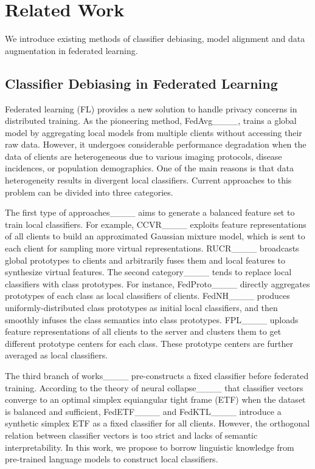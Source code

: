 \section{Related Work}
\label{sec:related-work}
We introduce existing methods of classifier debiasing, model alignment and data augmentation in federated learning.

\subsection{Classifier Debiasing in Federated Learning}
Federated learning (FL) provides a new solution to handle privacy concerns in distributed training. 
As the pioneering method, FedAvg____, trains a global model by aggregating local models from multiple clients without accessing their raw data. However, it undergoes considerable performance degradation when the data of clients are heterogeneous due to various imaging protocols, disease incidences, or population demographics. One of the main reasons is that data heterogeneity results in divergent local classifiers. Current approaches to this problem can be divided into three categories.

The first type of approaches____ aims to generate a balanced feature set to train local classifiers. For example, CCVR____ exploits feature representations of all clients to build an approximated Gaussian mixture model, which is sent to each client for sampling more virtual representations. RUCR____ broadcasts global prototypes to clients and arbitrarily fuses them and local features to synthesize virtual features.
The second category____ tends to replace local classifiers with class prototypes. For instance, FedProto____ directly aggregates prototypes of each class as local classifiers of clients. FedNH____ produces uniformly-distributed class prototypes as initial local classifiers, and then smoothly infuses the class semantics into class prototypes. FPL____ uploads feature representations of all clients to the server and clusters them to get different prototype centers for each class. These prototype centers are further averaged as local classifiers.

The third branch of works____ pre-constructs a fixed classifier before federated training. According to the theory of neural collapse____ that classifier vectors converge to an optimal simplex equiangular tight frame (ETF) when the dataset is balanced and sufficient, FedETF____ and FedKTL____ introduce a synthetic simplex ETF as a fixed classifier for all clients. However, the orthogonal relation between classifier vectors is too strict and lacks of semantic interpretability. In this work, we propose to borrow linguistic knowledge from pre-trained language models to construct local classifiers.  


